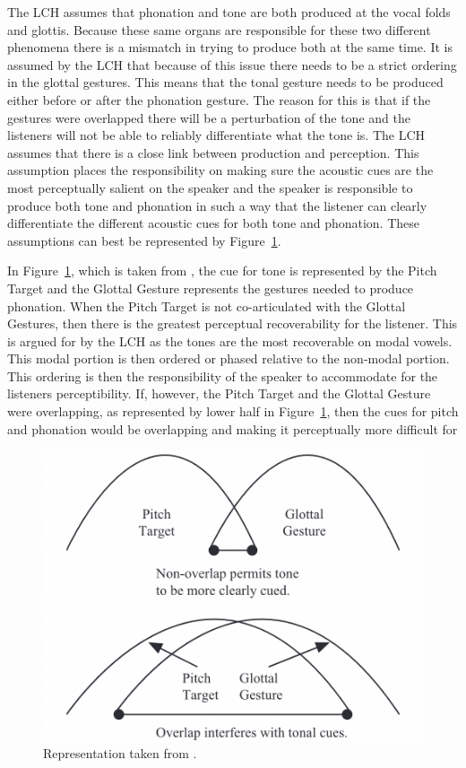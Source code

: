 \documentclass[12pt, letterpaper]{article}
\begin{document}
The LCH assumes that phonation and tone are both produced at the vocal folds and glottis. Because these same organs are responsible for these two different phenomena there is a mismatch in trying to produce both at the same time. It is assumed by the LCH that because of this issue there needs to be a strict ordering in the glottal gestures. This means that the tonal gesture needs to be produced either before or after the phonation gesture. The reason for this is that if the gestures were overlapped there will be a perturbation of the tone and the listeners will not be able to reliably differentiate what the tone is. The LCH assumes that there is a close link between production and perception. This assumption places the responsibility on making sure the acoustic cues are the most perceptually salient on the speaker and the speaker is responsible to produce both tone and phonation in such a way that the listener can clearly differentiate the different acoustic cues for both tone and phonation. These assumptions can best be represented by Figure~\ref{fig:GlottalGestures}. 

In Figure~\ref{fig:GlottalGestures}, which is taken from \citet{dicanioCoarticulationToneGlottal2012}, the cue for tone is represented by the Pitch Target and the Glottal Gesture represents the gestures needed to produce phonation. When the Pitch Target is not co-articulated with the Glottal Gestures, then there is the greatest perceptual recoverability for the listener. This is argued for by the LCH as the tones are the most recoverable on modal vowels. This modal portion is then ordered or phased relative to the non-modal portion. This ordering is then the responsibility of the speaker to accommodate for the listeners perceptibility. If, however, the Pitch Target and the Glottal Gesture were overlapping, as represented by lower half in Figure~\ref{fig:GlottalGestures}, then the cues for pitch and phonation would be overlapping and making it perceptually more difficult for 
\begin{figure}[!ht]
	\centering
	\includegraphics[width=.5\textwidth]{../Gestures.png}
	\caption{Representation taken from \citet{dicanioCoarticulationToneGlottal2012}.}
	\label{fig:GlottalGestures}
\end{figure}
\end{document}
